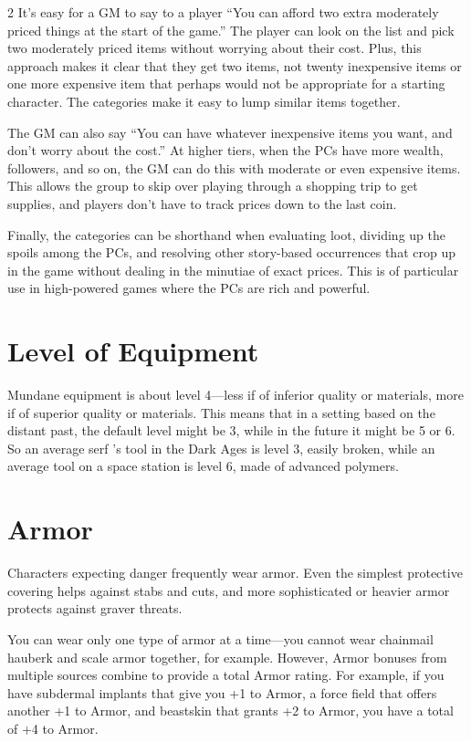 \begin{multicols}{2}
It’s easy for a GM to say to a player “You can afford two extra moderately priced things at the start of the game.” The player can look on the list and pick two moderately priced items without worrying about their cost. Plus, this approach makes it clear that they get two items, not twenty inexpensive items or one more expensive item that perhaps would not be appropriate for a starting character. The categories make it easy to lump similar items together.

The GM can also say “You can have whatever inexpensive items you want, and don’t worry about the cost.” At higher tiers, when the PCs have more wealth, followers, and so on, the GM can do this with moderate or even expensive items. This allows the group to skip over playing through a shopping trip to get supplies, and players don’t have to track prices down to the last coin.

Finally, the categories can be shorthand when evaluating loot, dividing up the spoils among the PCs, and resolving other story-based occurrences that crop up in the game without dealing in the minutiae of exact prices. This is of particular use in high-powered games where the PCs are rich and powerful.

\section{Level of Equipment}

Mundane equipment is about level 4—less if of inferior quality or materials, more if of superior quality or materials. This means that in a setting based on the distant past, the default level might be 3, while in the future it might be 5 or 6. So an average serf ’s tool in the Dark Ages is level 3, easily broken, while an average tool on a space station is level 6, made of advanced polymers.

\section{Armor}

Characters expecting danger frequently wear armor. Even the simplest protective covering helps against stabs and cuts, and more sophisticated or heavier armor protects against graver threats.

You can wear only one type of armor at a time—you cannot wear chainmail hauberk and scale armor together, for example. However, Armor bonuses from multiple sources combine to provide a total Armor rating. For example, if you have subdermal implants that give you +1 to Armor, a force field that offers another +1 to Armor, and beastskin that grants +2 to Armor, you have a total of +4 to Armor.


\end{multicols}
